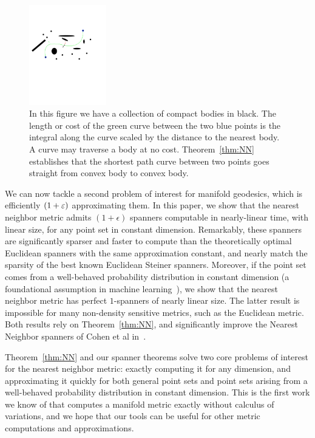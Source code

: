 \begin{enumerate}
\begin{figure}[htbp]
  \centering
    \includegraphics[width=0.3\textwidth]{Figures/example1.pdf}
    \caption{In this figure we have a collection of compact bodies in black.
      The length or cost of the green curve between the two blue points
      is the integral along the curve scaled by the distance to the nearest body.
    A curve may traverse a body at  no cost. Theorem~\ref{thm:NN}
establishes that the shortest path curve between two points goes straight
from convex body to convex body.}
  \label{fig:example}
\end{figure}




\end{enumerate}

We can now tackle a second problem of interest for manifold geodesics,
which is efficiently $(1+\varepsilon)$ approximating them. In this paper, we show
that the nearest neighbor metric admits $(1+\epsilon)$ spanners computable
in nearly-linear time, with linear size, for any point set in constant
dimension. Remarkably, these spanners are significantly sparser and faster
to compute than the theoretically optimal Euclidean spanners with the same
approximation constant, and nearly match the sparsity of the best known
Euclidean Steiner spanners. Moreover, if the point set comes from a
well-behaved probability distribution in constant dimension (a foundational
assumption in machine learning~\cite{}), we show that the nearest neighbor
metric has perfect $1$-spanners of nearly linear size. The latter result is
impossible for many non-density sensitive metrics, such as the Euclidean
metric. Both results rely on Theorem~\ref{thm:NN}, and significantly
improve the Nearest Neighbor spanners of Cohen et al in~\cite{}.

Theorem~\ref{thm:NN} and our spanner theorems solve two core problems of
interest for the nearest neighbor metric: exactly computing it for any
dimension, and approximating it quickly for both general point sets and
point sets arising from a well-behaved probability distribution in constant
dimension. This is the first work we know of that computes a manifold
metric exactly without calculus of variations, and we hope that our tools
can be useful for other metric computations and approximations.

